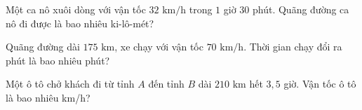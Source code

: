 \begin{ex}
  Một ca nô xuôi dòng với vận tốc $32\text{ km/h}$ trong $1$ giờ $30$ phút. Quãng đường ca nô đi được là bao nhiêu ki-lô-mét?
\end{ex}

\begin{ex}
  Quãng đường dài $175\text{ km}$, xe chạy với vận tốc $70\text{ km/h}$. Thời gian chạy đổi ra phút là bao nhiêu phút?
\end{ex}

\begin{ex}
  Một ô tô chở khách đi từ tỉnh $A$ đến tỉnh $B$ dài $210\text{ km}$ hết $3{,}5$ giờ. Vận tốc ô tô là bao nhiêu km/h?
\end{ex}
